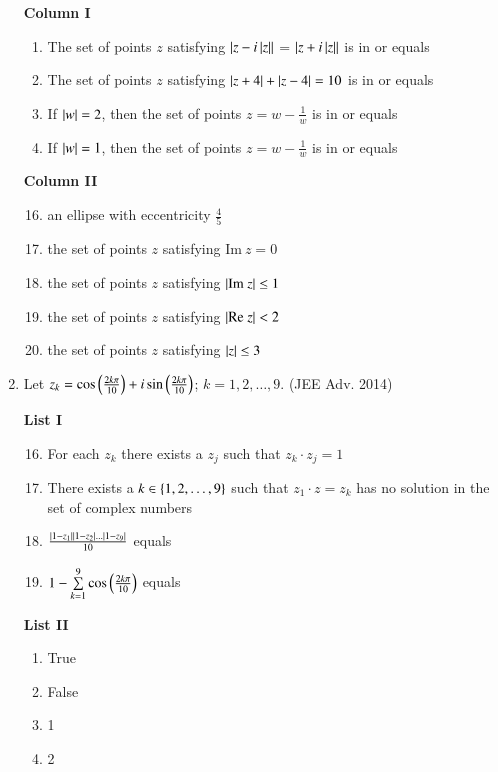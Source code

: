 \documentclass[journal]{IEEEtran}
\begin{document}
\begin{enumerate}
		\begin{multicols}{2}
			\textbf{Column I}
			\begin{enumerate}[label=(\Alph*)]
				\item The set of points $z$ satisfying $\left\vert z - i\left\vert z\right\vert\right\vert$ = $\left\vert z + i\left\vert z\right\vert\right\vert$ is in or equals
				\item The set of points $z$ satisfying $\left\vert z + 4\right\vert + \left\vert z - 4\right\vert = 10$ is in or equals
				\item If $\left\vert w\right\vert = 2$, then the set of points $z = w - \frac{1}{w}$ is in or equals
				\item If $\left\vert w\right\vert = 1$, then the set of points $z = w - \frac{1}{w}$ is in or equals
			\end{enumerate}
		\columnbreak
			\textbf{Column II}
			\begin{enumerate}[label=(\alph*)]
					\setcounter{enumii}{15}
				\item an ellipse with eccentricity $\frac{4}{5}$
				\item the set of points $z$ satisfying $\mathrm{Im}\ z = 0$
				\item the set of points $z$ satisfying $\left\vert\mathrm{Im}\ z\right\vert \le 1$
				\item the set of points $z$ satisfying $\left\vert\mathrm{Re}\ z\right\vert < 2$
				\item the set of points $z$ satisfying $\left\vert z\right\vert \le 3$
			\end{enumerate}
		\end{multicols}

	\item Let $z_k = \cos\left(\frac{2k\pi}{10}\right) + i\sin\left(\frac{2k\pi}{10}\right)$; $k = 1,2,\dots,9$.
		\hfill (JEE Adv. 2014)

		\begin{multicols}{2}
			\textbf{List I}
			\begin{enumerate}[label=\Alph*.]
					\setcounter{enumii}{15}
				\item For each $z_k$ there exists a $z_j$ such that $z_k \cdot z_j = 1$
				\item There exists a $k \in \left\{1,2,\dots, 9\right\}$ such that $z_1 \cdot z = z_k$ has
					no solution in the set of complex numbers
				\item $\frac {\left\vert1 - z_1\right\vert\left\vert1 - z_2\right\vert\dots\left\vert1-z_9\right\vert} {10}$ equals
				\item $1 - \sum\limits_{k=1}^9 \cos\left(\frac {2k\pi} {10}\right)$ equals
			\end{enumerate}
		\columnbreak
			\textbf{List II}
			\begin{enumerate}[label=\arabic*.]
				\item True
				\item False
				\item 1
				\item 2
			\end{enumerate}
		\end{multicols}


\end{enumerate}
\end{document}

